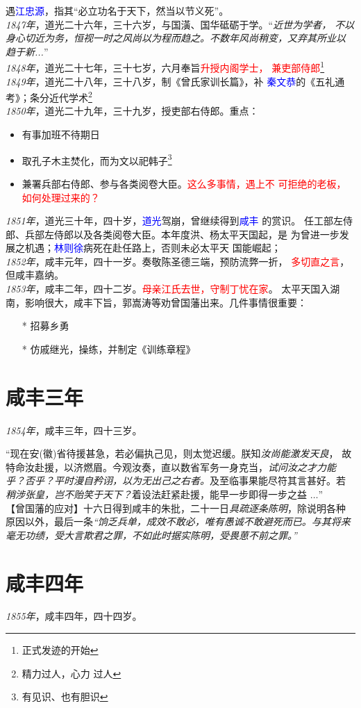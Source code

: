 \documentclass[11pt,a4paper,UTF8]{ctexbook}
\numberwithin{equation}{chapter}
\begin{document}
   遇\textcolor{blue}{江忠源}，指其“必立功名于天下，然当以节义死”。 \\
   \emph{1847年}，道光二十六年，三十六岁，与国潢、国华砥砺于学。“\emph{近世为学者，
     不以身心切近为务，恒视一时之风尚以为程而趋之。不数年风尚稍变，又弃其所业以
     趋于新...}” \\
   \emph{1848年}，道光二十七年，三十七岁，六月奉旨\textcolor{red}{升授内阁学士，
     兼吏部侍郎}\footnote{正式发迹的开始} \\
   \emph{1849年}，道光二十八年，三十八岁，制《曾氏家训长篇》，补
   \textcolor{blue}{秦文恭}的《五礼通考》；条分近代学术\footnote{精力过人，心力
     过人} \\
   \emph{1850年}，道光二十九年，三十九岁，授吏部右侍郎。重点：
   \begin{itemize}
     \item{有事加班不待期日}
     \item{取孔子木主焚化，而为文以祀韩子\footnote{有见识、也有胆识}}
     \item{兼署兵部右侍郎、参与各类阅卷大臣。\textcolor{red}{这么多事情，遇上不
           可拒绝的老板，如何处理过来的？}}
   \end{itemize} 
   \emph{1851年}，道光三十年，四十岁，\textcolor{blue}{道光}驾崩，曾继续得到\textcolor{blue}{咸丰}
   的赏识。 任工部左侍郎、兵部左侍郎以及各类阅卷大臣。本年度洪、杨太平天国起，是
   为曾进一步发展之机遇；\textcolor{blue}{林则徐}病死在赴任路上，否则未必太平天
   国能崛起；\\
   \emph{1852年}，咸丰元年，四十一岁。奏敬陈圣德三端，预防流弊一折，
   \textcolor{red}{多切直之言}，但咸丰嘉纳。 \\
   \emph{1853年}，咸丰二年，四十二岁。\textcolor{red}{母亲江氏去世，守制丁忧在家}。
   太平天国入湖南，影响很大，咸丰下旨，郭嵩涛等劝曾国藩出来。几件事情很重要：
   \begin{itemize}
     \item[*]{招募乡勇}
     \item[*]{仿戚继光，操练，并制定《训练章程》}
   \end{itemize}
  \section{咸丰三年}
  \emph{1854年}，咸丰三年，四十三岁。

   “现在安(徽)省待援甚急，若必偏执己见，则太觉迟缓。朕知\emph{汝尚能激发天良}，
   故特命汝赴援，以济燃眉。今观汝奏，直以数省军务一身克当，\emph{试问汝之才力能
     乎？否乎？平时漫自矜诩，以为无出己之右者。}及至临事果能尽符其言甚好。若
   \emph{稍涉张皇，岂不贻笑于天下？}着设法赶紧赴援，能早一步即得一步之益
   $\ldots$” \\

   【曾国藩的应对】十六日得到咸丰的朱批，二十一日\emph{具疏逐条陈明}，除说明各种
   原因以外，最后一条\emph{“饷乏兵单，成效不敢必，唯有愚诚不敢避死而已。与其将来
     毫无功绩，受大言欺君之罪，不如此时据实陈明，受畏葸不前之罪。”}

  \section{咸丰四年}
  \emph{1855年}，咸丰四年，四十四岁。
\end{document}
